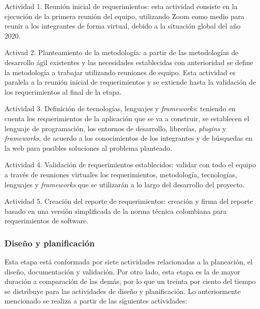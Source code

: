 \begin{APAitemize}
    \item Actividad 1. Reunión inicial de requerimientos: esta actividad consiste en la ejecución de la primera reunión del equipo, utilizando Zoom como medio para reunir a los integrantes de forma virtual, debido a la situación global del año 2020.
    \item Activad 2. Planteamiento de la metodología: a partir de las metodologías de desarrollo ágil existentes y las necesidades establecidas con anterioridad se define la metodología a trabajar utilizando reuniones de equipo. Esta actividad es paralela a la reunión inicial de requerimientos y se extiende hasta la validación de los requerimientos al final de la etapa.
    \item Actividad 3. Definición de tecnologías, lenguajes y \textit{frameworks}: teniendo en cuenta los requerimientos de la aplicación que se va a construir, se establecen el lenguaje de programación, los entornos de desarrollo, librerías, \textit{plugins} y \textit{frameworks}, de acuerdo a los conocimientos de los integrantes y de búsquedas en la web para posibles soluciones al problema planteado.
    \item Actividad 4. Validación de requerimientos establecidos: validar con todo el equipo a través de reuniones virtuales los requerimientos, metodología, tecnologías, lenguajes y \textit{frameworks} que se utilizarán a lo largo del desarrollo del proyecto.
    \item Actividad 5. Creación del reporte de requerimientos: creación y firma del reporte basado en una versión simplificada de la norma técnica colombiana para requerimientos de software. 
\end{APAitemize}

\subsubsection{Diseño y planificación}
Esta etapa está conformada por siete actividades relacionadas a la planeación, el diseño, documentación y validación. Por otro lado, esta etapa es la de mayor duración a comparación de las demás, por lo que un treinta por ciento del tiempo se distribuye para las actividades de diseño y planificación. Lo anteriormente mencionado se realiza a partir de las siguientes actividades:

